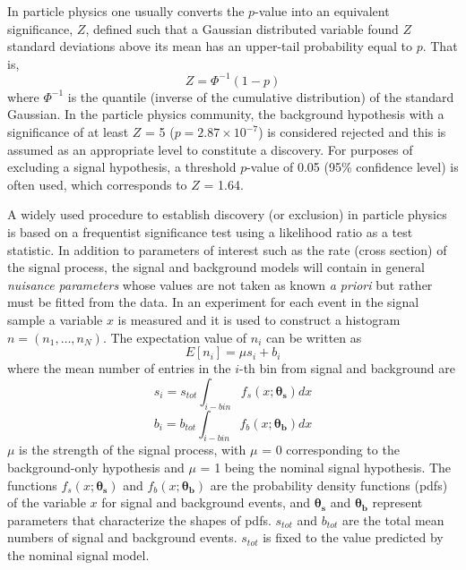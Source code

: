 \documentclass[a4paper, oneside, 11pt, openright]{book}
\begin{document}
 			In particle physics one usually converts the $p$-value into an equivalent significance, $Z$, defined such that a Gaussian distributed variable found $Z$ standard deviations above its mean has an upper-tail probability equal to $p$. That is,
 			\begin{equation}\label{eq:Z}
 				Z = \Phi^{-1}(1-p)
 			\end{equation}
 			where $\Phi^{-1}$ is the quantile (inverse of the cumulative distribution) of the standard Gaussian. In the particle physics community, the background hypothesis with a significance of at least $Z$ = 5 ($p = 2.87\times10^{-7}$) is considered rejected and this is assumed as an appropriate level to constitute a discovery. For purposes of excluding a signal hypothesis, a threshold $p$-value of 0.05 (95\% confidence level) is often used, which corresponds to $Z$ = 1.64.
 			
 			A widely used procedure to establish discovery (or exclusion) in particle physics is based on a frequentist significance test using a likelihood ratio as a test statistic. In addition to parameters of interest such as the rate (cross section) of the signal process, the signal and background models will contain in general \textit{nuisance parameters} whose values are not taken as known \textit{a priori} but rather must be fitted from the data. In an experiment for each event in the signal sample a variable $x$ is measured and it is used to construct a histogram $n = (n_1,\dots, n_N)$. The expectation value of $n_i$ can be written as
 			\begin{equation}
 				E[n_i] = \mu s_i + b_i
 			\end{equation}
 			where the mean number of entries in the $i$-th bin from signal and background are
 			\begin{equation}
 				s_i = s_{tot} \int_{i-bin} f_s(x;\boldsymbol{\theta_s}) dx
 			\end{equation}
 			\begin{equation}
 				b_i = b_{tot} \int_{i-bin} f_b(x;\boldsymbol{\theta_b}) dx
 			\end{equation}
 			$\mu$ is the strength of the signal process, with $\mu$ = 0 corresponding to the background-only hypothesis and $\mu$ = 1 being the nominal signal hypothesis. The functions $f_s(x;\boldsymbol{\theta_s})$ and $f_b(x;\boldsymbol{\theta_b})$ are the probability density functions (pdfs) of the variable $x$ for signal and background events, and $\boldsymbol{\theta_s}$ and $\boldsymbol{\theta_b}$ represent parameters that characterize the shapes of pdfs. $s_{tot}$ and $b_{tot}$ are the total mean numbers of signal and background events. $s_{tot}$ is fixed to the value predicted by the nominal signal model.
 			
\end{document}
